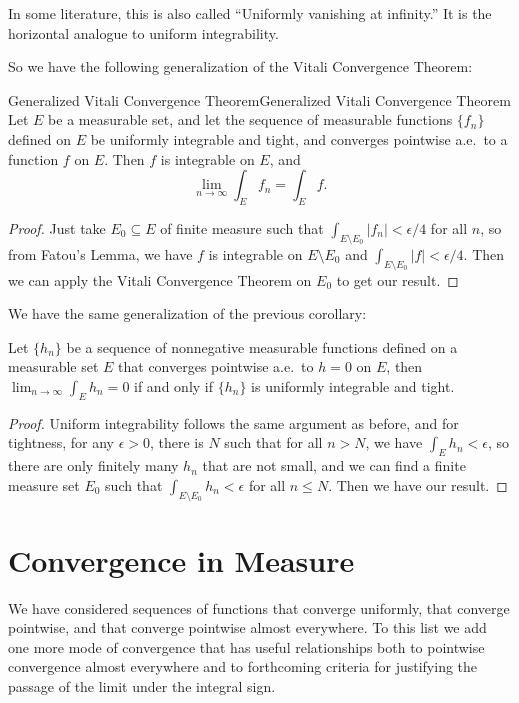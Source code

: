 \documentclass[../main.tex]{subfiles}
\begin{document}
\begin{remark}
	In some literature, this is also called ``Uniformly vanishing at infinity.'' It is the horizontal analogue to uniform integrability.
\end{remark}

So we have the following generalization of the Vitali Convergence Theorem:
\begin{theorem}{Generalized Vitali Convergence Theorem}{Generalized Vitali Convergence Theorem}
	Let $E$ be a measurable set, and let the sequence of measurable functions $\{ f_n \}$ defined on $E$ be uniformly integrable and tight, and converges pointwise a.e.\ to a function $f$ on $E$. Then $f$ is integrable on $E$, and
	\begin{equation}
		\lim_{n \to \infty} \int_E f_n = \int_E f.
	\end{equation}
\end{theorem}
\begin{proof}
	Just take $E_0 \subseteq E$ of finite measure such that $\int_{E \setminus E_0} |f_n| < \epsilon / 4$ for all $n$, so from Fatou's Lemma, we have $f$ is integrable on $E \setminus E_0$ and $\int_{E \setminus E_0} |f| < \epsilon / 4$. Then we can apply the Vitali Convergence Theorem on $E_0$ to get our result.
\end{proof}

We have the same generalization of the previous corollary:
\begin{proposition}{}{}
	Let $\{ h_n \}$ be a sequence of nonnegative measurable functions defined on a measurable set $E$ that converges pointwise a.e.\ to $h = 0$ on $E$, then $\lim_{n \to \infty} \int_E h_n = 0$ if and only if $\{ h_n \}$ is uniformly integrable and tight.
\end{proposition}
\begin{proof}
	Uniform integrability follows the same argument as before, and for tightness, for any $\epsilon > 0$, there is $N$ such that for all $n > N$, we have $\int_E h_n < \epsilon $, so there are only finitely many $h_n$ that are not small, and we can find a finite measure set $E_0$ such that $\int_{E \setminus E_0} h_n < \epsilon $ for all $n \leq N$. Then we have our result.
\end{proof}

\section{Convergence in Measure}
We have considered sequences of functions that converge uniformly, that converge pointwise, and that converge pointwise almost everywhere. To this list we add one more mode of convergence that has useful relationships both to pointwise convergence almost everywhere and to forthcoming criteria for justifying the passage of the limit under the integral sign.
\end{document}
